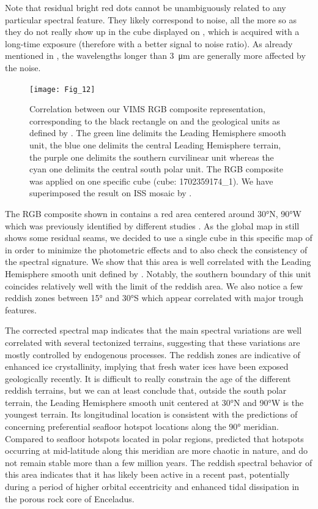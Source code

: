 \documentclass{arxiv-icarus}
\begin{document}
Note that residual bright red dots cannot be unambiguously related to any particular spectral feature. They likely correspond to noise, all the more so as they do not really show up in the cube displayed on , which is acquired with a long-time exposure (therefore with a better signal to noise ratio). As already mentioned in , the wavelengths longer than \SI{3}{\um} are generally more affected by the noise.


\begin{figure}[!ht]
    \texttt{[image: Fig\_12]}
    \caption{Correlation between our VIMS RGB composite representation, corresponding to the black rectangle on  and the geological units as defined by \cite{Crow-Willard2015}. The green line delimits the Leading Hemisphere smooth unit, the blue one delimits the central Leading Hemisphere terrain, the purple one delimits the southern curvilinear unit whereas the cyan one delimits the central south polar unit. The RGB composite was applied on one specific cube (cube: 1702359174\_1). We have superimposed the result on ISS mosaic by \cite{Bland2018}.}
    \label{fig:fig_12}
\end{figure}


The RGB composite shown in  contains a red area centered around \ang{30}N, \ang{90}W which was previously identified by different studies \citep{Ries2015, Scipioni2017, Combe2019}. As the global map in  still shows some residual seams, we decided to use a single cube in this specific map of  in order to minimize the photometric effects and to also check the consistency of the spectral signature. We show that this area is well correlated with the Leading Hemisphere smooth unit defined by \cite{Crow-Willard2015}. Notably, the southern boundary of this unit coincides relatively well with the limit of the reddish area. We also notice a few reddish zones between \ang{15} and \ang{30}S which appear correlated with major trough features.


The corrected spectral map indicates that the main spectral variations are well correlated with several tectonized terrains, suggesting that these variations are mostly controlled by endogenous processes. The reddish zones are indicative of enhanced ice crystallinity, implying that fresh water ices have been exposed geologically recently. It is difficult to really constrain the age of the different reddish terrains, but we can at least conclude that, outside the south polar terrain, the Leading Hemisphere smooth unit centered at \ang{30}N and \ang{90}W is the youngest terrain. Its longitudinal location is consistent with the predictions of \cite{Choblet2017} concerning preferential seafloor hotspot locations along the \ang{90} meridian. Compared to seafloor hotspots located in polar regions, \cite{Choblet2017} predicted that hotspots occurring at mid-latitude along this meridian are more chaotic in nature, and do not remain stable more than a few million years. The reddish spectral behavior of this area indicates that it has likely been active in a recent past, potentially during a period of higher orbital eccentricity and enhanced tidal dissipation in the porous rock core of Enceladus.
\end{document}
